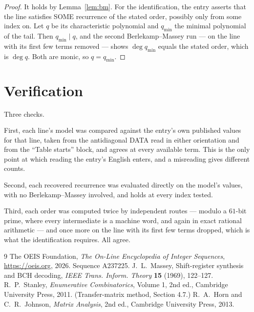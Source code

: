 \documentclass[11pt,a4paper]{article}
\theoremstyle{plain}
\theoremstyle{definition}
\begin{document}
\begin{proof}
It holds by Lemma~\ref{lem:bm}. For the identification, the entry asserts that the line
satisfies SOME recurrence of the stated order, possibly only from some index on. Let $q$ be its
characteristic polynomial and $q_{\min}$ the minimal polynomial of the tail. Then
$q_{\min}\mid q$, and the second Berlekamp--Massey run --- on the line with its first few
terms removed --- shows $\deg q_{\min}$ equals the stated order, which is $\deg q$. Both are
monic, so $q=q_{\min}$.
\end{proof}

\section{Verification}

Three checks.

First, each line's model was compared against the entry's own published values for that line,
taken from the antidiagonal DATA read in either orientation and from the ``Table starts''
block, and agrees at every available term. This is the only point at which reading the entry's
English enters, and a misreading gives different counts.

Second, each recovered recurrence was evaluated directly on the model's values, with no
Berlekamp--Massey involved, and holds at every index tested.

Third, each order was computed twice by independent routes --- modulo a $61$-bit prime, where
every intermediate is a machine word, and again in exact rational arithmetic --- and once more
on the line with its first few terms dropped, which is what the identification requires. All
agree.

\begin{thebibliography}{9}
 The OEIS Foundation, \emph{The On-Line Encyclopedia of Integer
Sequences}, \url{https://oeis.org}, 2026. Sequence A237225.
 J.~L.~Massey, Shift-register synthesis and BCH decoding, \emph{IEEE
Trans. Inform. Theory} \textbf{15} (1969), 122--127.
 R.~P.~Stanley, \emph{Enumerative Combinatorics}, Volume 1, 2nd ed.,
Cambridge University Press, 2011. (Transfer-matrix method, Section 4.7.)
 R.~A.~Horn and C.~R.~Johnson, \emph{Matrix Analysis}, 2nd ed., Cambridge
University Press, 2013.
\end{thebibliography}
\end{document}
